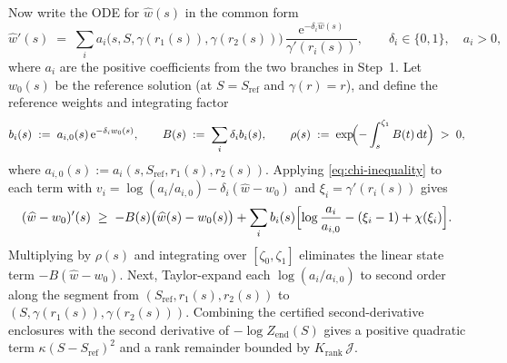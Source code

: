 \documentclass[11pt]{article}
\numberwithin{equation}{section}
\theoremstyle{plain}
\theoremstyle{definition}
\newcommand{\1}{\mathbf{1}}
\newcommand{\calJ}{\mathcal{J}}
\begin{document}
Now write the ODE for $\widehat{w}(s)$ in the common form
\[
  \widehat{w}'(s) \;=\; \sum_i a_i\bigl(s, S, \gamma(r_1(s)), \gamma(r_2(s))\bigr)\,\frac{\mathrm{e}^{-\delta_i \widehat{w}(s)}}{\gamma'(r_i(s))},
  \qquad \delta_i \in \{0, 1\},\quad a_i > 0,
\]
where $a_i$ are the positive coefficients from the two branches in Step~1. Let $w_0(s)$ be the reference solution (at $S = S_{\mathrm{ref}}$ and $\gamma(r) = r$), and define the reference weights and integrating factor
\[
  b_i(s) \;:=\; a_{i, 0}(s)\,\mathrm{e}^{-\delta_i w_0(s)},
  \qquad
  B(s) \;:=\; \sum_i \delta_i b_i(s),
  \qquad
  \rho(s) \;:=\; \exp\!\Bigl(-\int_s^{\zeta_1} B(t)\,\mathrm{d}t\Bigr) \;>\; 0,
\]
where $a_{i, 0}(s) := a_i(s, S_{\mathrm{ref}}, r_1(s), r_2(s))$. Applying \cref{eq:chi-inequality} to each term with $v_i = \log(a_i/a_{i, 0}) - \delta_i(\widehat{w} - w_0)$ and $\xi_i = \gamma'(r_i(s))$ gives
\[
  (\widehat{w} - w_0)'(s) \;\ge\; -B(s)\bigl(\widehat{w}(s) - w_0(s)\bigr) + \sum_i b_i(s)\Bigl[\log\frac{a_i}{a_{i, 0}} - (\xi_i - 1) + \chi(\xi_i)\Bigr].
\]
Multiplying by $\rho(s)$ and integrating over $[\zeta_0, \zeta_1]$ eliminates the linear state term $-B(\widehat{w} - w_0)$. Next, Taylor-expand each $\log(a_i/a_{i, 0})$ to second order along the segment from $(S_{\mathrm{ref}}, r_1(s), r_2(s))$ to $(S, \gamma(r_1(s)), \gamma(r_2(s)))$. Combining the certified second-derivative enclosures with the second derivative of $-\log Z_{\mathrm{end}}(S)$ gives a positive quadratic term $\kappa(S - S_{\mathrm{ref}})^2$ and a rank remainder bounded by $K_{\mathrm{rank}}\,\calJ$.
\end{document}
